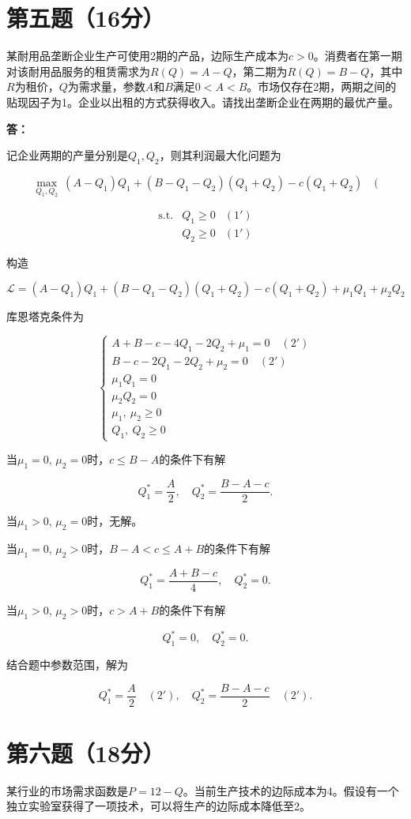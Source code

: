 \documentclass[12pt]{article}
\begin{document}
\section*{第五题（16分）}
某耐用品垄断企业生产可使用2期的产品，边际生产成本为$c>0$。消费者在第一期对该耐用品服务的租赁需求为$R(Q)=A-Q$，第二期为$R(Q)=B-Q$，其中$R$为租价，$Q$为需求量，参数$A$和$B$满足$0<A<B$。市场仅存在2期，两期之间的贴现因子为1。企业以出租的方式获得收入。请找出垄断企业在两期的最优产量。

\noindent \textbf{答：}

记企业两期的产量分别是$Q_1,Q_2$，则其利润最大化问题为

$$\max\limits_{Q_1,Q_2}\:(A-Q_1)Q_1+(B-Q_1-Q_2)(Q_1+Q_2)-c(Q_1+Q_2)\quad($$

$$\begin{array}{ccc}\mathrm{s.t.}&Q_1\geq0&(1')\\[2ex]&Q_2\geq0&(1')\end{array}$$

构造

$$\mathcal{L}=(A-Q_1)Q_1+(B-Q_1-Q_2)(Q_1+Q_2)-c(Q_1+Q_2)+\mu_1Q_1+\mu_2Q_2$$

库恩塔克条件为

$$\begin{cases}A+B-c-4Q_1-2Q_2+\mu_1=0\quad(2')\\[2ex]B-c-2Q_1-2Q_2+\mu_2=0\quad(2')\\[2ex]\mu_1Q_1=0\\[2ex]\mu_2Q_2=0\\[2ex]\mu_1,\:\mu_2\geq0\\[2ex]Q_1,\:Q_2\geq0\end{cases}$$

当$\mu_1=0$, $\mu_2=0$时，$c\leq B-A$的条件下有解

$$Q_1^*=\frac{A}{2},\quad Q_2^*=\frac{B-A-c}{2}.$$

当$\mu_1>0$, $\mu_2=0$时，无解。

当$\mu_1=0$, $\mu_2>0$时，$B-A<c\leq A+B$的条件下有解

$$Q_1^*=\frac{A+B-c}{4},\quad Q_2^*=0.$$

当$\mu_1>0$, $\mu_2>0$时，$c>A+B$的条件下有解

$$Q_1^*=0,\quad Q_2^*=0.$$

结合题中参数范围，解为

$$Q_1^*=\frac{A}{2}\quad(2'),\quad Q_2^*=\frac{B-A-c}{2}\quad(2').$$

\section*{第六题（18分）}
某行业的市场需求函数是$P=12-Q$。当前生产技术的边际成本为4。假设有一个独立实验室获得了一项技术，可以将生产的边际成本降低至2。
\end{document}
